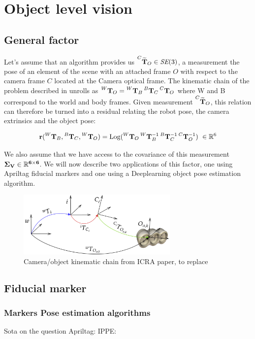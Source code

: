 \chapter{Object level vision}
\minitoc


\section{General factor}
Let's assume that an algorithm provides us $\prescript{C}{}{\widetilde{{\bf T}}}_{O} \in \textit{SE}(3)$, a measurement the pose of an element 
of the scene with an attached frame $O$ with respect to the camera frame $C$ located at the Camera optical frame.
The kinematic chain of the problem described in  unrolls as 
$\prescript{W}{}{{\bf T}}_{O} = \prescript{W}{}{{\bf T}}_{B}\prescript{B}{}{{\bf T}}_{C}\prescript{C}{}{{\bf T}}_{O}$ where W and B correspond to the world and body frames.
Given measurement $\prescript{C}{}{\widetilde{{\bf T}}}_{O}$, this relation can therefore be turned into a residual relating 
the robot pose, the camera extrinsics and the object pose:

\begin{equation}
    {\bf r} (\prescript{W}{}{{\bf T}}_{B}, \prescript{B}{}{{\bf T}}_{C}, \prescript{W}{}{{\bf T}}_{O}) = \operatorname*{Log}(\prescript{W}{}{{\bf T}}_{O} \prescript{W}{}{{\bf T}}_{B}^{-1} \prescript{B}{}{{\bf T}}_{C}^{-1} \prescript{C}{}{{\bf T}}_{O}^{-1}) ~ \in \mathbb{R}^6
\end{equation}

We also assume that we have access to the covariance of this measurement 
$\bf \Sigma_V \in \mathbb{R}^{6 \times 6}$. We will now describe two applications of this factor, one using Apriltag fiducial markers and one using 
a Deeplearning object pose estimation algorithm.

\begin{figure}
    \centering
    \includegraphics[width=0.7\textwidth]{figures/fig_kinematic_Cesar.png}
    \caption{Camera/object kinematic chain from ICRA paper, to replace }
    \label{fig:camera_object_chain}
\end{figure}

\section{Fiducial marker}
\subsection{Markers Pose estimation algorithms}
Sota on the question
Apriltag: \cite{wang2016iros}
IPPE: \cite{collins2014infinitesimal}

